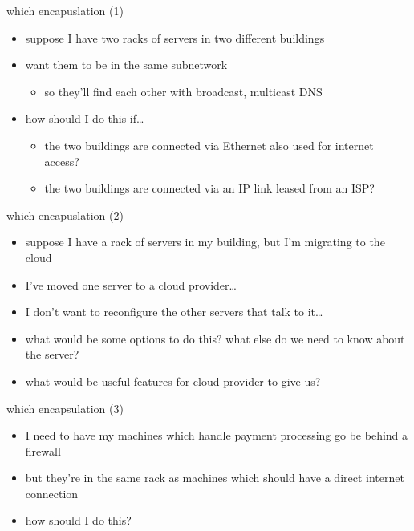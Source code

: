 \begin{frame}{which encapuslation (1)}
    \begin{itemize}
    \item suppose I have two racks of servers in two different buildings
    \item want them to be in the same subnetwork
        \begin{itemize}
        \item so they'll find each other with broadcast, multicast DNS
        \end{itemize}
    \item how should I do this if\ldots
        \begin{itemize}
        \item the two buildings are connected via Ethernet also used for internet access?
        \item the two buildings are connected via an IP link leased from an ISP?
        \end{itemize}
    \end{itemize}
\end{frame}

\begin{frame}{which encapuslation (2)}
    \begin{itemize}
    \item suppose I have a rack of servers in my building, but I'm migrating to the cloud
    \item I've moved one server to a cloud provider\ldots
    \item I don't want to reconfigure the other servers that talk to it\ldots
    \vspace{.5cm}
    \item what would be some options to do this? what else do we need to know about the server?
    \item what would be useful features for cloud provider to give us?
    \end{itemize}
\end{frame}

\begin{frame}{which encapsulation (3)}
    \begin{itemize}
    \item I need to have my machines which handle payment processing go be behind a firewall
    \item but they're in the same rack as machines which should have a direct internet connection
    \vspace{.5cm}
    \item how should I do this?
    \end{itemize}
\end{frame}
